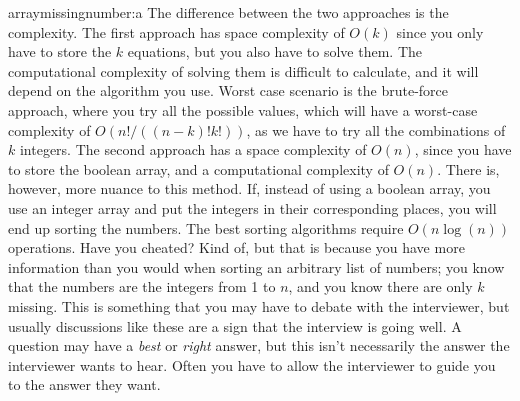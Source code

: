 \begin{subanswer}{arraymissingnumber:a}
The difference between the two approaches is the complexity.
The first approach has space complexity of $O(k)$ since you only have to store the $k$ equations, but you also have to solve them.
The computational complexity of solving them is difficult to calculate, and it will depend on the algorithm you use.
Worst case scenario is the brute-force approach, where you try all the possible values,
which will have a worst-case complexity of $O(n!/((n-k)!k!))$, as we have to try all the combinations of $k$ integers.
The second approach has a space complexity of $O(n)$, since you have to store the boolean array, and a computational complexity of $O(n)$.
There is, however, more nuance to this method. If, instead of using a boolean array, you use an integer array and put the integers in their corresponding places, you will end up sorting the numbers.
The best sorting algorithms require $O(n \log(n))$ operations.
Have you cheated?
Kind of, but that is because you have more information than you would when sorting an arbitrary list of numbers; you know that the numbers are the integers from 1 to $n$, and you know there are only $k$ missing.
This is something that you may have to debate with the interviewer, but usually discussions like these are a sign that the interview is going well.
A question may have a \emph{best} or \emph{right} answer, but this isn't necessarily the answer the interviewer wants to hear.
Often you have to allow the interviewer to guide you to the answer they want.


\end{subanswer}

